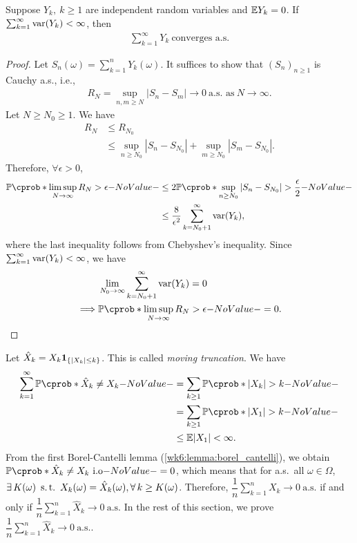 \documentclass[12pt]{article}
\begin{document}
\begin{Theorem} \label{wk7:thm:var_conv_criteria}
Suppose $Y_k,\ k \geq 1$ are independent random variables and $\E Y_k = 0$. If $\sum_{k=1}^{\infty} \operatorname{var}(Y_k) < \infty$, then
\begin{align*}
\sum_{k=1}^{\infty} Y_k \ \text{converges a.s.}
\end{align*}
\end{Theorem}
\begin{proof}
Let $S_n(\omega) = \sum_{k=1}^n Y_k(\omega)$. It suffices to show that $(S_n)_{n \geq 1}$ is Cauchy a.s., i.e.,
\begin{align*}
R_N = \sup_{n,m \geq N} |S_n - S_m| \to 0 \ \text{a.s. as} \ N \to \infty.
\end{align*}
Let $N \geq N_0 \geq 1$. We have
\begin{align*}
R_N 
&\leq R_{N_0} \\
&\leq \sup_{n \geq N_0} |S_n - S_{N_0}| + \sup_{m \geq N_0} |S_m - S_{N_0}|.
\end{align*}
Therefore, $\forall \epsilon > 0$,
\begin{align*}
\P(\limsup_{N \to \infty} R_N > \epsilon) 
&\leq 2 \P(\sup_{n \geq N_0} |S_n - S_{N_0}| > \frac{\epsilon}{2}) \\
&\leq \frac{8}{\epsilon^2} \sum_{k = N_0 +1}^{\infty} \var(Y_k),
\end{align*} 
where the last inequality follows from Chebyshev's inequality. Since $\sum_{k=1}^{\infty} \operatorname{var}(Y_k) < \infty$, we have
\begin{align*}
&\lim_{N_0 \to \infty}\sum_{k = N_0 +1}^{\infty} \var(Y_k) = 0 \\
\implies
&\P(\limsup_{N \to \infty} R_N > \epsilon) = 0.
\end{align*} 
\end{proof}

Let $\hat{X}_k = X_k {\bf 1}_{\{|X_k| \leq k\}}$. This is called \emph{moving truncation}. We have
\begin{align*}
\sum_{k=1}^{\infty} \P(\hat{X}_k \neq X_k) 
&= \sum_{k \geq 1} \P(|X_k| > k) \\
&= \sum_{k \geq 1} \P(|X_1| > k) \\
&\leq \E |X_1| < \infty.
\end{align*} 
From the first Borel-Cantelli lemma (\cref{wk6:lemma:borel_cantelli}), we obtain $\P(\hat{X}_k \neq X_k \ \text{i.o}) = 0$, which means that for a.s.\ all $\omega \in \Omega$, $\exists K(\omega)\ \st X_k(\omega) = \hat{X}_k(\omega), \forall k \geq K(\omega)$. Therefore, $\dfrac{1}{n} \sum_{k=1}^{n} X_k \to 0 \ \text{a.s.}$ if and only if $\dfrac{1}{n} \sum_{k=1}^{n} \hat{X}_k \to 0 \ \text{a.s.}$ In the rest of this section, we prove $\dfrac{1}{n} \sum_{k=1}^{n} \hat{X}_k \to 0 \ \text{a.s.}$.
\end{document}
